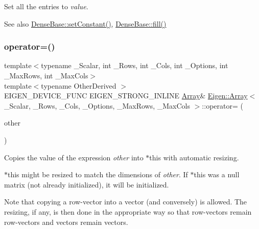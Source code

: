 Set all the entries to {\itshape value}. \begin{DoxySeeAlso}{See also}
\mbox{\hyperlink{class_eigen_1_1_dense_base_a19b2bc788277e9ab3f967a8857e290ae}{Dense\+Base\+::set\+Constant()}}, \mbox{\hyperlink{class_eigen_1_1_dense_base_a4f5eb49e80db57f79a8353ecdf811418}{Dense\+Base\+::fill()}} 
\end{DoxySeeAlso}
\mbox{\label{class_eigen_1_1_array_a8415de9a2e74e018c98d6e6271b307a5}} 
\subsubsection{\texorpdfstring{operator=()}{operator=()}\hspace{0.1cm}{\footnotesize\ttfamily [3/4]}}
{\footnotesize\ttfamily template$<$typename \+\_\+\+Scalar, int \+\_\+\+Rows, int \+\_\+\+Cols, int \+\_\+\+Options, int \+\_\+\+Max\+Rows, int \+\_\+\+Max\+Cols$>$ \\
template$<$typename Other\+Derived $>$ \\
E\+I\+G\+E\+N\+\_\+\+D\+E\+V\+I\+C\+E\+\_\+\+F\+U\+NC E\+I\+G\+E\+N\+\_\+\+S\+T\+R\+O\+N\+G\+\_\+\+I\+N\+L\+I\+NE \mbox{\hyperlink{class_eigen_1_1_array}{Array}}\& \mbox{\hyperlink{class_eigen_1_1_array}{Eigen\+::\+Array}}$<$ \+\_\+\+Scalar, \+\_\+\+Rows, \+\_\+\+Cols, \+\_\+\+Options, \+\_\+\+Max\+Rows, \+\_\+\+Max\+Cols $>$\+::operator= (\begin{DoxyParamCaption}\item[{const \mbox{\hyperlink{class_eigen_1_1_dense_base}{Dense\+Base}}$<$ Other\+Derived $>$ \&}]{other }\end{DoxyParamCaption})\hspace{0.3cm}{\ttfamily [inline]}}

Copies the value of the expression {\itshape other} into {\ttfamily $\ast$this} with automatic resizing.

$\ast$this might be resized to match the dimensions of {\itshape other}. If $\ast$this was a null matrix (not already initialized), it will be initialized.

Note that copying a row-\/vector into a vector (and conversely) is allowed. The resizing, if any, is then done in the appropriate way so that row-\/vectors remain row-\/vectors and vectors remain vectors. \mbox{\label{class_eigen_1_1_array_a56cb38f362f88a6239f802ea226fee6a}} 
